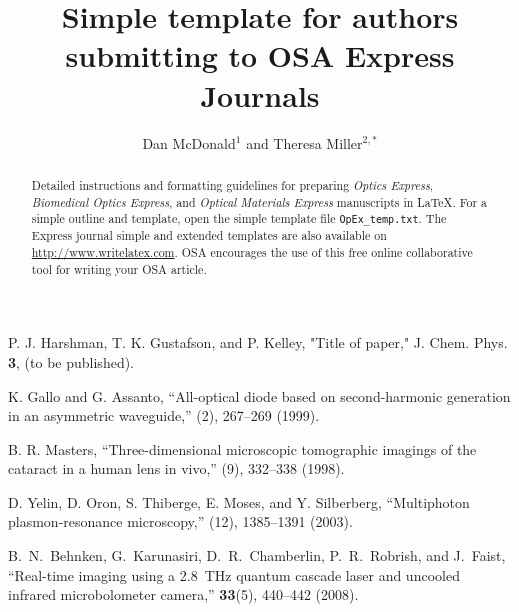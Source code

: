 \documentclass[10pt,letterpaper]{article}
\begin{document}
\title{Simple template for authors submitting to OSA Express Journals}

\author{Dan McDonald$^1$ and Theresa Miller$^{2,*}$}

\address{$^1$Peer Review, Publications Department, Optical Society of America, Washington, D.C., 20036, USA\\
$^2$Publications Department, Optical Society of America, Washington, D.C., 20036, USA}




\begin{abstract}
Detailed instructions and formatting guidelines for preparing \textit{Optics Express}, \textit{Biomedical Optics Express}, and \textit{Optical Materials Express} manuscripts in \LaTeX. For a simple outline and template, open the simple template file \texttt{OpEx\_temp.txt}. The Express journal simple and extended templates are also available on \url{http://www.writelatex.com}. OSA encourages the use of this free online collaborative tool for writing your OSA article.\\
\end{abstract}


\begin{thebibliography}{99}
P. J. Harshman, T. K. Gustafson, and P. Kelley, "Title of paper," J. Chem. Phys. {\bf 3}, (to be published).

 K. Gallo and G. Assanto, ``All-optical diode based on second-harmonic generation in an asymmetric waveguide,'' (2), 267--269 (1999).

 B. R. Masters, ``Three-dimensional microscopic tomographic imagings of the cataract in a human lens in vivo,'' (9), 332--338 (1998).

 D. Yelin,  D. Oron,  S. Thiberge,  E. Moses, and Y. Silberberg, ``Multiphoton plasmon-resonance microscopy,'' (12), 1385--1391 (2003).

B.~N.~Behnken, G.~Karunasiri, D.~R.~Chamberlin, P.~R.~Robrish, and J.~Faist,
``Real-time imaging using a 2.8~THz quantum cascade laser and uncooled infrared microbolometer camera,''
\ol \textbf{33}(5), 440--442 (2008).

\end{thebibliography}
\end{document}
